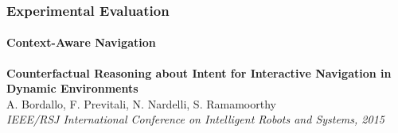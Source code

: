 \begin{frame}
	\frametitle{Experimental Evaluation}
	\framesubtitle{Context-Aware Navigation}
	
	\vspace{0.05cm}
	
	\begin{center}
	\end{center}
	
	\vspace{-0.4cm}
	\tiny
	
	\begin{tabbing}
		\hspace{1.5cm}
		\textbf{Counterfactual Reasoning about Intent for Interactive Navigation in Dynamic
				Environments} \\
		\hspace{1.5cm}
		A. Bordallo, F. Previtali, N. Nardelli, S. Ramamoorthy \\
		\hspace{1.5cm}
		\emph{IEEE/RSJ International Conference on Intelligent Robots and Systems, 2015} \\
	\end{tabbing}
	

\end{frame}
